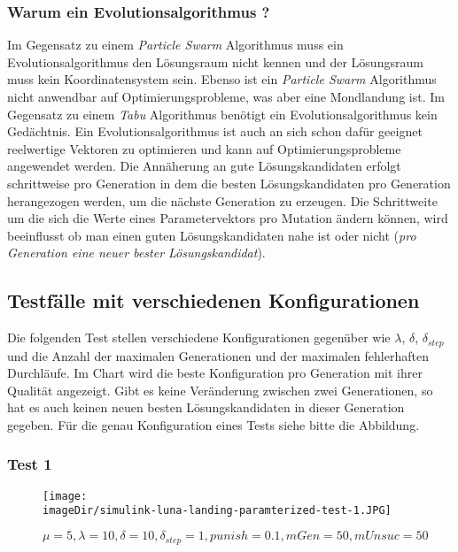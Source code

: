 \subsubsection{Warum ein Evolutionsalgorithmus ?}
Im Gegensatz zu einem \emph{Particle Swarm} Algorithmus muss ein Evolutionsalgorithmus den Lösungsraum nicht kennen und der Lösungsraum muss kein Koordinatensystem sein. Ebenso ist ein \emph{Particle Swarm} Algorithmus nicht anwendbar auf Optimierungsprobleme, was aber eine Mondlandung ist. Im Gegensatz zu einem \emph{Tabu} Algorithmus benötigt ein Evolutionsalgorithmus kein Gedächtnis. Ein Evolutionsalgorithmus ist auch an sich schon dafür geeignet reelwertige Vektoren zu optimieren und kann auf Optimierungsprobleme angewendet werden. 
\newline
\newline
Die Annäherung an gute Lösungskandidaten erfolgt schrittweise pro Generation in dem die besten Lösungskandidaten pro Generation herangezogen werden, um die nächste Generation zu erzeugen. Die Schrittweite um die sich die Werte eines Parametervektors pro Mutation ändern können, wird beeinflusst ob man einen guten Lösungskandidaten nahe ist oder nicht (\emph{pro Generation eine neuer bester Lösungskandidat}).

\subsection{Testfälle mit verschiedenen Konfigurationen}
Die folgenden Test stellen verschiedene Konfigurationen gegenüber wie $\lambda$, $\delta$, $\delta_{step}$ und die Anzahl der maximalen Generationen und der maximalen fehlerhaften Durchläufe. Im Chart wird die beste Konfiguration pro Generation mit ihrer Qualität angezeigt. Gibt es keine Veränderung zwischen zwei Generationen, so hat es auch keinen neuen besten Lösungskandidaten in dieser Generation gegeben. Für die genau Konfiguration eines Tests siehe bitte die Abbildung.
\newpage

\subsubsection{Test 1}
\begin{figure}[h]
	\centering
	\texttt{[image: \\imageDir/simulink-luna-landing-paramterized-test-1.JPG]}
	\caption{$\mu=5, \lambda=10, \delta=10, \delta_{step}=1, punish=0.1, mGen=50, mUnsuc=50 $}
	\label{fig:simulink-luna-landing-paramterized-test-1}
\end{figure}

